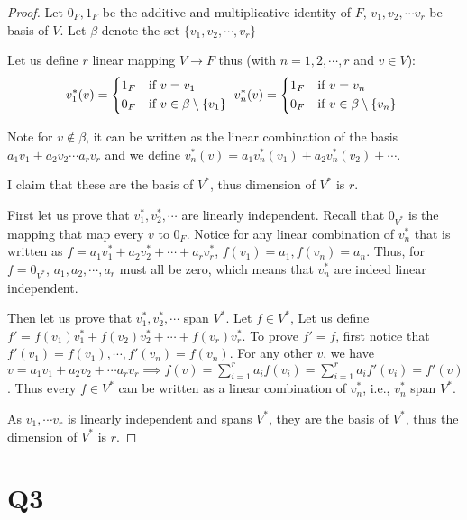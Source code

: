 \documentclass[12pt, a4paper]{article}
\theoremstyle{definition}
\theoremstyle{remark}
\begin{document}
\begin{proof}
Let $0_F, 1_F$ be the additive and multiplicative identity of $F$, 
$v_1, v_2, \cdots v_r$ be basis of $V$. Let $\beta$ denote the set $\{v_1, v_2, \cdots, v_r \}$

Let us define $r$ linear mapping $V \rightarrow F$ thus (with $n = 1, 2, \cdots , r$ and $v \in V$): 
\[
v^*_1(v) = \begin{dcases*}
1_F & if $v = v_1$ \\
0_F & if $v \in \beta \setminus \{v_1\}$
\end{dcases*}
v^*_n(v) = \begin{dcases*}
1_F & if $v = v_n$ \\
0_F & if $v \in \beta \setminus \{v_n\}$ 
\end{dcases*}
\]



Note for $v \notin \beta$, it can be written as the linear combination of the basis $a_1v_1 + a_2v_2 \cdots a_rv_r$ and we define $v^*_n(v) = a_1v^*_n(v_1) + a_2v^*_n(v_2) + \cdots $.

I claim that these are the basis of $V^*$, thus dimension of $V^*$ is $r$.

First let us prove that $v^*_1, v^*_2, \cdots$ are linearly independent. Recall that $0_{V^*}$ is the mapping that map every $v$ to $0_F$. 
Notice for any linear combination of $v^*_n$ that is written as $f = a_1v^*_1 + a_2v^*_2+ \cdots + a_rv^*_r$, $f(v_1) = a_1, f(v_n) = a_n$. Thus, for $f=0_{V^*}$, $a_1, a_2, \cdots , a_r$ must all be zero, which means that $v^*_n$ are indeed linear independent. 

Then let us prove that $v^*_1, v^*_2, \cdots$ span $V^*$. Let $f \in V^*$, Let us define $f' = f(v_1)v^*_1 + f(v_2)v^*_2 + \cdots + f(v_r)v^*_r $. 
To prove $f'=f$, first notice that $f'(v_1) = f(v_1), \cdots, f'(v_n) = f(v_n)$. 
For any other $v$, we have $v = a_1v_1 + a_2v_2 + \cdots a_rv_r \implies f(v) = \sum_{i=1}^r a_if(v_i) = \sum_{i=1}^r a_if'(v_i) = f'(v)$.
Thus every $f \in V^*$ can be written as a linear combination of $v^*_n$, i.e., $v^*_n$ span $V^*$.

As $v_1, \cdots v_r$ is linearly independent and spans $V^*$, they are the basis of $V^*$, thus the dimension of $V^*$ is $r$.
\end{proof}

\section{Q3}
\end{document}
